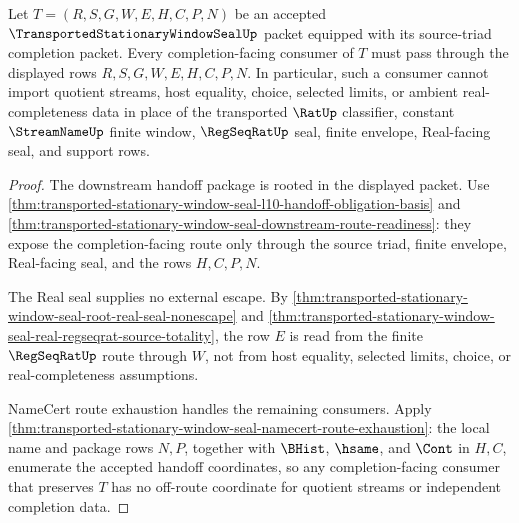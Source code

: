 \begin{theorem}
\label{thm:transported-stationary-window-seal-completion-handoff-nonescape}
Let $T=(R,S,G,W,E,H,C,P,N)$ be an accepted $\TransportedStationaryWindowSealUp$ packet equipped with its source-triad completion packet. Every completion-facing consumer of $T$ must pass through the displayed rows $R,S,G,W,E,H,C,P,N$. In particular, such a consumer cannot import quotient streams, host equality, choice, selected limits, or ambient real-completeness data in place of the transported $\RatUp$ classifier, constant $\StreamNameUp$ finite window, $\RegSeqRatUp$ seal, finite envelope, Real-facing seal, and support rows.
\end{theorem}
\begin{proof}
The downstream handoff package is rooted in the displayed packet. Use \autoref{thm:transported-stationary-window-seal-l10-handoff-obligation-basis} and \autoref{thm:transported-stationary-window-seal-downstream-route-readiness}: they expose the completion-facing route only through the source triad, finite envelope, Real-facing seal, and the rows $H,C,P,N$.

The Real seal supplies no external escape. By \autoref{thm:transported-stationary-window-seal-root-real-seal-nonescape} and \autoref{thm:transported-stationary-window-seal-real-regseqrat-source-totality}, the row $E$ is read from the finite $\RegSeqRatUp$ route through $W$, not from host equality, selected limits, choice, or real-completeness assumptions.

NameCert route exhaustion handles the remaining consumers. Apply \autoref{thm:transported-stationary-window-seal-namecert-route-exhaustion}: the local name and package rows $N,P$, together with $\BHist$, $\hsame$, and $\Cont$ in $H,C$, enumerate the accepted handoff coordinates, so any completion-facing consumer that preserves $T$ has no off-route coordinate for quotient streams or independent completion data.
\end{proof}

